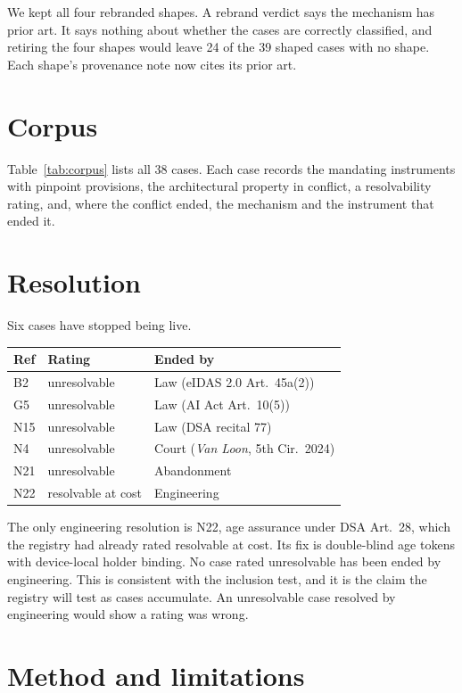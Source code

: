 \documentclass[10pt,twocolumn]{article}
\begin{document}
We kept all four rebranded shapes. A rebrand verdict says the mechanism has
prior art. It says nothing about whether the cases are correctly classified,
and retiring the four shapes would leave 24 of the 39 shaped cases with no shape. Each
shape's provenance note now cites its prior art.

\section{Corpus}

Table~\ref{tab:corpus} lists all 38 cases. Each case records the mandating
instruments with pinpoint provisions, the architectural property in conflict,
a resolvability rating, and, where the conflict ended, the mechanism and the
instrument that ended it.



\section{Resolution}

Six cases have stopped being live.

\begin{center}
\footnotesize
\begin{tabular}{lll}
\toprule
Ref & Rating & Ended by \\
\midrule
B2 & unresolvable & Law (eIDAS 2.0 Art.~45a(2)) \\
G5 & unresolvable & Law (AI Act Art.~10(5)) \\
N15 & unresolvable & Law (DSA recital 77) \\
N4 & unresolvable & Court (\emph{Van Loon}, 5th Cir.\ 2024) \\
N21 & unresolvable & Abandonment \\
N22 & resolvable at cost & Engineering \\
\bottomrule
\end{tabular}
\end{center}

The only engineering resolution is N22, age assurance under DSA Art.~28,
which the registry had already rated resolvable at cost. Its fix is
double-blind age tokens with device-local holder binding. No case rated
unresolvable has been ended by engineering. This is consistent with the
inclusion test, and it is the claim the registry will test as cases
accumulate. An unresolvable case resolved by engineering would show a rating
was wrong.

\section{Method and limitations}
\end{document}
